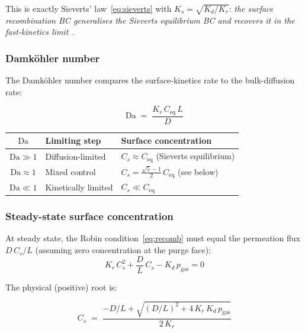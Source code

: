 \documentclass[11pt,a4paper]{article}
\newcommand{\Da}{\mathrm{Da}}
\begin{document}
This is exactly Sieverts' law~\eqref{eq:sieverts} with $K_s = \sqrt{K_d/K_r}$:
\emph{the surface recombination BC generalises the Sieverts equilibrium BC and
recovers it in the fast-kinetics limit}~\cite{Pick1985}.

\subsubsection{Damköhler number}

The Damköhler number compares the surface-kinetics rate to the bulk-diffusion
rate:

\begin{tcolorbox}[eqbox,title={Damköhler number}]
\begin{equation}\label{eq:Da}
  \Da
  \;=\;
  \frac{K_r\,C_\text{eq}\,L}{D}
\end{equation}
\end{tcolorbox}

\begin{center}
\begin{tabular}{cll}
\toprule
$\Da$ & Limiting step & Surface concentration \\
\midrule
$\Da \gg 1$ & Diffusion-limited & $C_s \approx C_\text{eq}$ (Sieverts equilibrium) \\
$\Da \approx 1$ & Mixed control & $C_s = \tfrac{\sqrt{5}-1}{2}\,C_\text{eq}$ (see below) \\
$\Da \ll 1$ & Kinetically limited & $C_s \ll C_\text{eq}$ \\
\bottomrule
\end{tabular}
\end{center}

\subsubsection{Steady-state surface concentration}

At steady state, the Robin condition~\eqref{eq:recomb} must equal the
permeation flux $D\,C_s/L$ (assuming zero concentration at the purge face):
\begin{equation}\label{eq:recomb_ss}
  K_r\,C_s^2 + \frac{D}{L}\,C_s - K_d\,p_\text{gas} = 0
\end{equation}

The physical (positive) root is:
\begin{tcolorbox}[eqbox,title={Steady-state surface concentration (general Da)}]
\begin{equation}\label{eq:Cs_general}
  C_s
  \;=\;
  \frac{-D/L + \sqrt{(D/L)^2 + 4\,K_r\,K_d\,p_\text{gas}}}{2\,K_r}
\end{equation}
\end{tcolorbox}
\end{document}
